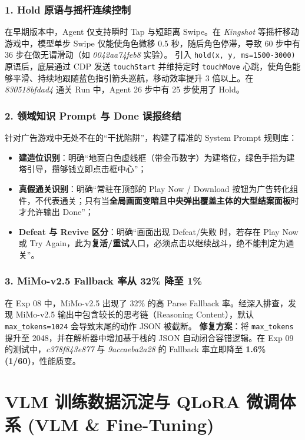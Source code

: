 \documentclass[11pt,a4paper]{ctexart}
\begin{document}
\subsubsection{1. Hold 原语与摇杆连续控制}
在早期版本中，Agent 仅支持瞬时 Tap 与短距离 Swipe。在 \textit{Kingshot} 等摇杆移动游戏中，模型单步 Swipe 仅能使角色微移 0.5 秒，随后角色停滞，导致 60 步中有 36 步在做无谓滑动（如 \textit{0042aa74feb8} 实验）。
引入 \texttt{hold(x, y, ms=1500-3000)} 原语后，底层通过 CDP 发送 \texttt{touchStart} 并维持定时 \texttt{touchMove} 心跳，使角色能够平滑、持续地跟随蓝色指引箭头巡航，移动效率提升 3 倍以上。在 \textit{830518bfdad4} 通关 Run 中，Agent 26 步中有 25 步使用了 Hold。

\subsubsection{2. 领域知识 Prompt 与 Done 误报终结}
针对广告游戏中无处不在的“干扰陷阱”，构建了精准的 System Prompt 规则库：
\begin{itemize}
  \item \textbf{建造位识别}：明确“地面白色虚线框（带金币数字）为建塔位，绿色手指为建塔引导，攒够钱立即点击框中心”；
  \item \textbf{真假通关识别}：明确“常驻在顶部的 Play Now / Download 按钮为广告转化组件，不代表通关；只有当\textbf{全局画面变暗且中央弹出覆盖主体的大型结案面板}时才允许输出 Done”；
  \item \textbf{Defeat 与 Revive 区分}：明确“画面出现 Defeat/失败 时，若存在 Play Now 或 Try Again，此为\textbf{复活/重试}入口，必须点击以继续战斗，绝不能判定为通关”。
\end{itemize}

\subsubsection{3. MiMo-v2.5 Fallback 率从 32\% 降至 1\%}
在 Exp 08 中，MiMo-v2.5 出现了 32\% 的高 Parse Fallback 率。经深入排查，发现 MiMo-v2.5 输出中包含较长的思考链（Reasoning Content），默认 \texttt{max\_tokens=1024} 会导致末尾的动作 JSON 被截断。
\textbf{修复方案}：将 \texttt{max\_tokens} 提升至 2048，并在解析器中增加基于栈的 JSON 自动闭合容错逻辑。在 Exp 09 的测试中，\textit{c378f843e877} 与 \textit{9accaeba2a28} 的 Fallback 率立即降至 \textbf{1.6\% (1/60)}，性能质变。

\newpage
\section{VLM 训练数据沉淀与 QLoRA 微调体系 (VLM \& Fine-Tuning)}
\end{document}
